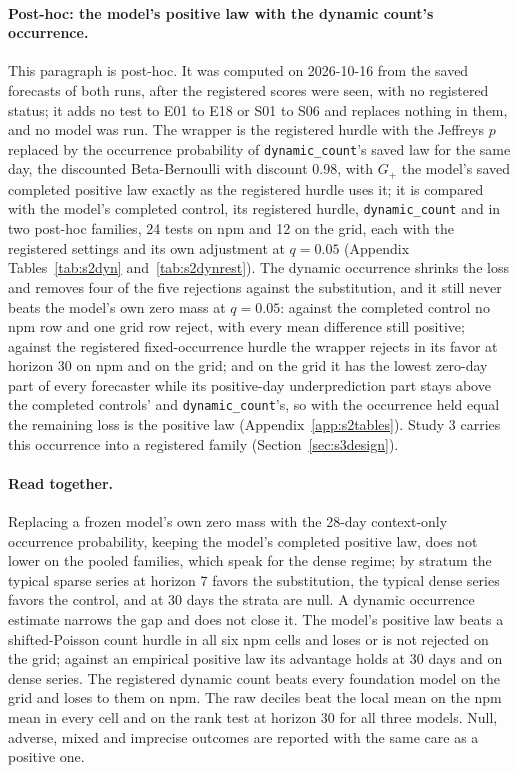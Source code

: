 \paragraph{Post-hoc: the model's positive law with the dynamic count's occurrence.} This paragraph is
post-hoc. It was computed on 2026-10-16 from the saved forecasts of both runs, after the registered
scores were seen, with no registered status; it adds no test to E01 to E18 or S01 to S06 and replaces
nothing in them, and no model was run. The wrapper is the registered hurdle with the Jeffreys $p$
replaced by the occurrence probability of \texttt{dynamic\_count}'s saved law for the same day, the
discounted Beta-Bernoulli with discount 0.98, with $G_+$ the model's saved completed positive law exactly
as the registered hurdle uses it; it is compared with the model's completed control, its registered
hurdle, \texttt{dynamic\_count} and \hc{} in two post-hoc families, 24 tests on npm and 12 on the grid,
each with the registered settings and its own adjustment at $q = 0.05$ (Appendix
Tables~\ref{tab:s2dyn} and~\ref{tab:s2dynrest}). The dynamic occurrence shrinks the loss and removes
four of the five rejections against the substitution, and it still never beats the model's own zero mass
at $q = 0.05$: against the completed control no npm row and one grid row reject, with every mean
difference still positive; against the registered fixed-occurrence hurdle the wrapper rejects in its
favor at horizon 30 on npm and on the grid; and on the grid it has the lowest zero-day part of every
forecaster while its positive-day underprediction part stays above the completed controls' and
\texttt{dynamic\_count}'s, so with the occurrence held equal the remaining loss is the positive law
(Appendix~\ref{app:s2tables}). Study 3 carries this occurrence into a registered family
(Section~\ref{sec:s3design}).

\paragraph{Read together.} Replacing a frozen model's own zero mass with the 28-day context-only occurrence
probability, keeping the model's completed positive law, does not lower \qs{} on the pooled families, which
speak for the dense regime; by stratum the typical sparse series at horizon 7 favors the substitution, the
typical dense series favors the control, and at 30 days the strata are null. A dynamic occurrence estimate
narrows the gap and does not close it. The model's positive law beats a shifted-Poisson count hurdle in all
six npm cells and loses or is not rejected on the grid; against an empirical positive law its advantage holds
at 30 days and on dense series. The registered dynamic count beats every foundation model on the grid and
loses to them on npm. The raw deciles beat the local mean on the npm mean in every cell and on the rank test
at horizon 30 for all three models. Null, adverse, mixed and
imprecise outcomes are reported with the same care as a positive one.
